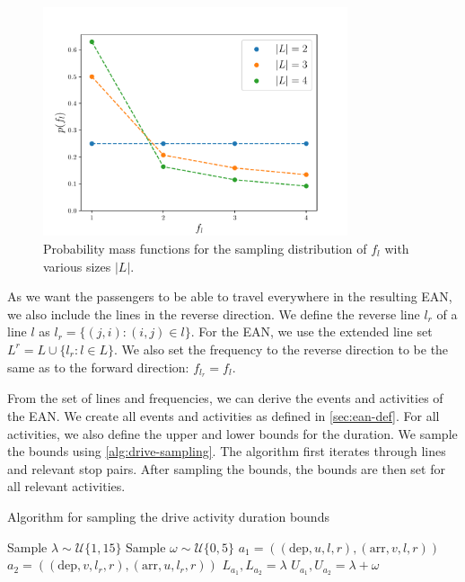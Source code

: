 \documentclass[english, 12pt, a4paper, sci, utf8, a-2b, online]{aaltothesis}
\newcommand{\unif}[1]{\mathcal{U}\{#1\}}
\begin{document}
\begin{figure}
    \centering
    \includegraphics[width=0.8\textwidth]{figures/generation-rl-sample-density.pdf}
    \caption{Probability mass functions for the sampling distribution of $f_l$ with various sizes $|L|$.}
    \label{fig:generation-rl-mass}
\end{figure}


As we want the passengers to be able to travel everywhere in the resulting EAN, we also include the lines in the reverse direction. We define the reverse line $l_r$ of a line $l$ as $l_r = \{(j, i):(i, j) \in l\}$. For the EAN, we use the extended line set $L^r = L \cup \{l_r : l \in L \}$. We also set the frequency to the reverse direction to be the same as to the forward direction: $f_{l_r} = f_l$.

From the set of lines and frequencies, we can derive the events and activities of the EAN. We create all events and activities as defined in \cref{sec:ean-def}. For all activities, we also define the upper and lower bounds for the duration. We sample the bounds using \cref{alg:drive-sampling}. The algorithm first iterates through lines and relevant stop pairs. After sampling the bounds, the bounds are then set for all relevant activities.


\begin{algorithm}

\caption{Algorithm for sampling the drive activity duration bounds}
\label{alg:drive-sampling}
\begin{algorithmic}
            \State Sample $\lambda \sim \unif{1, 15}$ 
            \State Sample $\omega \sim \unif{0, 5}$ 
                \State $a_1 = ((\text{dep}, u, l, r), (\text{arr}, v, l, r))$ 
                \State $a_2 = ((\text{dep}, v, l_r, r), (\text{arr}, u, l_r, r))$ 
                \State $L_{a_1}, L_{a_2} = \lambda$
                \State $U_{a_1}, U_{a_2} = \lambda + \omega$
            \EndFor
        \EndFor
    \EndFor
\end{algorithmic}

\end{algorithm}
\end{document}
